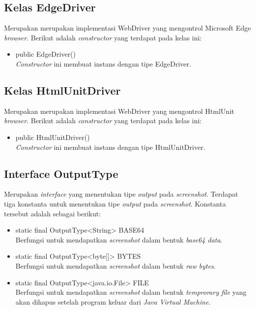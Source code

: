 \subsection{Kelas EdgeDriver}
\label{subsec:edgedriver}
Merupakan merupakan implementasi WebDriver yang mengontrol Microsoft Edge \textit{browser}. Berikut adalah \textit{constructor} yang terdapat pada kelas ini:
\begin{itemize}
\item public EdgeDriver()\\
\textit{Constructor} ini membuat instans dengan tipe EdgeDriver.
\end{itemize}


\subsection{Kelas HtmlUnitDriver}
\label{subsec:htmlunitdriver}
Merupakan merupakan implementasi WebDriver yang mengontrol HtmlUnit \textit{browser}. Berikut adalah \textit{constructor} yang terdapat pada kelas ini:
\begin{itemize}
\item public HtmlUnitDriver()\\
\textit{Constructor} ini membuat instans dengan tipe HtmlUnitDriver.
\end{itemize}


\subsection{Interface OutputType}
\label{subsec:output_type}
Merupakan \textit{interface} yang menentukan tipe \textit{output} pada \textit{screenshot}. Terdapat tiga konstanta untuk menentukan tipe \textit{output} pada \textit{screenshot}. Konstanta tersebut adalah sebagai berikut:
\begin{itemize}
\item static final OutputType<String> BASE64\\
Berfungsi untuk mendapatkan \textit{screenshot} dalam bentuk \textit{base64 data}.
\item static final OutputType<byte[]> BYTES\\
Berfungsi untuk mendapatkan \textit{screenshot} dalam bentuk \textit{raw bytes}.
\item static final OutputType<java.io.File> FILE\\
Berfungsi untuk mendapatkan \textit{screenshot} dalam bentuk \textit{temprorary file} yang akan dihapus setelah program keluar dari \textit{Java Virtual Machine}.
\end{itemize}

